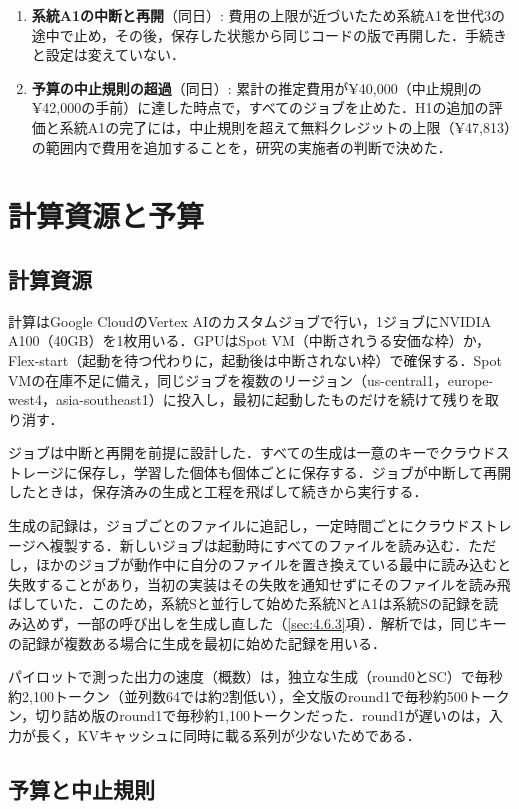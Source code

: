 \begin{enumerate}
\item \textbf{系統A1の中断と再開}（同日）: 費用の上限が近づいたため系統A1を世代3の途中で止め，その後，保存した状態から同じコードの版で再開した．手続きと設定は変えていない．
\item \textbf{予算の中止規則の超過}（同日）: 累計の推定費用が¥40,000（中止規則の¥42,000の手前）に達した時点で，すべてのジョブを止めた．H1の追加の評価と系統A1の完了には，中止規則を超えて無料クレジットの上限（¥47,813）の範囲内で費用を追加することを，研究の実施者の判断で決めた．
\end{enumerate}

\section{計算資源と予算}
\label{sec:4.7}

\subsection{計算資源}
\label{sec:4.7.1}

計算はGoogle CloudのVertex AIのカスタムジョブで行い，1ジョブにNVIDIA A100（40GB）を1枚用いる．GPUはSpot VM（中断されうる安価な枠）か，Flex-start（起動を待つ代わりに，起動後は中断されない枠）で確保する．Spot VMの在庫不足に備え，同じジョブを複数のリージョン（us-central1，europe-west4，asia-southeast1）に投入し，最初に起動したものだけを続けて残りを取り消す．

ジョブは中断と再開を前提に設計した．すべての生成は一意のキーでクラウドストレージに保存し，学習した個体も個体ごとに保存する．ジョブが中断して再開したときは，保存済みの生成と工程を飛ばして続きから実行する．

生成の記録は，ジョブごとのファイルに追記し，一定時間ごとにクラウドストレージへ複製する．新しいジョブは起動時にすべてのファイルを読み込む．ただし，ほかのジョブが動作中に自分のファイルを置き換えている最中に読み込むと失敗することがあり，当初の実装はその失敗を通知せずにそのファイルを読み飛ばしていた．このため，系統Sと並行して始めた系統NとA1は系統Sの記録を読み込めず，一部の呼び出しを生成し直した（\ref{sec:4.6.3}項）．解析では，同じキーの記録が複数ある場合に生成を最初に始めた記録を用いる．

パイロットで測った出力の速度（概数）は，独立な生成（round0とSC）で毎秒約2,100トークン（並列数64では約2割低い），全文版のround1で毎秒約500トークン，切り詰め版のround1で毎秒約1,100トークンだった．round1が遅いのは，入力が長く，KVキャッシュに同時に載る系列が少ないためである．

\subsection{予算と中止規則}
\label{sec:4.7.2}

